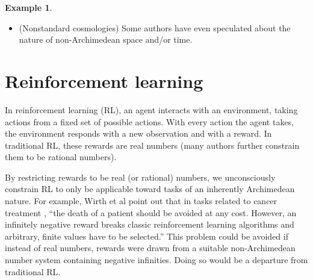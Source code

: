 \documentclass[reqno]{article}
\theoremstyle{definition}
\newtheorem{example}[theorem]{Example}
\begin{document}
\begin{example}
\begin{itemize}
        intelligent than $A_\infty$. We first pointed this out in
        \cite{alexander2019measuring}, where we propose measuring the
        intelligence of mechanical
        knowing agents using computable ordinals, the same non-Archimedean number system
        which proof theorists use to measure logical strength of mathematical
        theories. Incidentally, if AGI intelligence is non-Archimedean, then
        Proposition \ref{maindilemma} shows it is
        impossible to measure machine intelligence using real numbers without some
        of those measurements being misleading\footnote{This would solve an open problem
        implicitly stated by Legg and Hutter \cite{legg} when they said of their
        real-number universal intelligence measure: ``...none of these people have
        been able to communicate why the work [on measuring universal intelligence
        using real numbers] is so obviously flawed in any concrete way ...
        If anyone would like to properly explain their position to us in the future,
        we promise not to chase you down the street!''}.
        \item
        (Nonstandard cosmologies)
        Some
        authors
        \cite{al2016surreal} \cite{andreka2012logic}
        \cite{reeder2012infinitesimals} \cite{rosinger2007cosmic}
        \cite{chen2019infinitesimal} have
        even speculated about the nature of non-Archimedean space and/or
        time.
    \end{itemize}
\end{example}


\section{Reinforcement learning}
\label{reinforcementlearningsection}

In reinforcement learning (RL), an agent interacts with an environment,
taking actions from a fixed set of possible actions. With every action the
agent takes, the environment responds with a new observation and with a
reward. In traditional RL, these rewards are real numbers (many
authors further constrain them to be rational numbers).

By restricting rewards to be real (or rational) numbers, we unconsciously
constrain RL to only be applicable toward tasks of an inherently Archimedean
nature. For example, Wirth et al point out \cite{wirth2017survey} that
in tasks related to cancer treatment \cite{zhao2009reinforcement},
``the death of a patient should be avoided at any cost. However, an
infinitely negative reward breaks classic reinforcement learning algorithms
and arbitrary, finite values have to be selected.'' This problem could be
avoided if instead of real numbers, rewards were drawn from a suitable
non-Archimedean number system containing negative infinities. Doing so would
be a departure from traditional RL.
\end{document}
